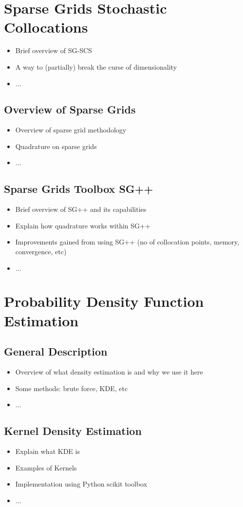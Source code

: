 \section{Sparse Grids Stochastic Collocations}
\label{sec:Sparse Grids Stochastic Collocations}
\begin{itemize}
\item Brief overview of SG-SCS
\item A way to (partially) break the curse of dimensionality
\item ...
\end{itemize}
\subsection{Overview of Sparse Grids}
\label{subsec:Overview of Sparse Grids}
\begin{itemize}
\item Overview of sparse grid methodology
\item Quadrature on sparse grids
\item ...
\end{itemize}	
\subsection{Sparse Grids Toolbox SG++}
\label{subsec:Sparse Grids Toolbox SG++}
\begin{itemize}
\item Brief overview of SG++ and its capabilities
\item Explain how quadrature works within SG++
\item Improvements gained from using SG++ (no of collocation points, memory, convergence, etc)
\item ...
\end{itemize}
\section{Probability Density Function Estimation}
\label{sec:Probability Density Function Estimation}
\subsection{General Description}
\label{subsec:General Description}
\begin{itemize}
\item Overview of what density estimation is and why we use it here
\item Some methods: brute force, KDE, etc
\item ...
\end{itemize}
\subsection{Kernel Density Estimation}
\label{subsec:Kernel Density Estimation}
\begin{itemize}
\item Explain what KDE is
\item Examples of Kernels
\item Implementation using Python scikit toolbox
\item ...
\end{itemize}